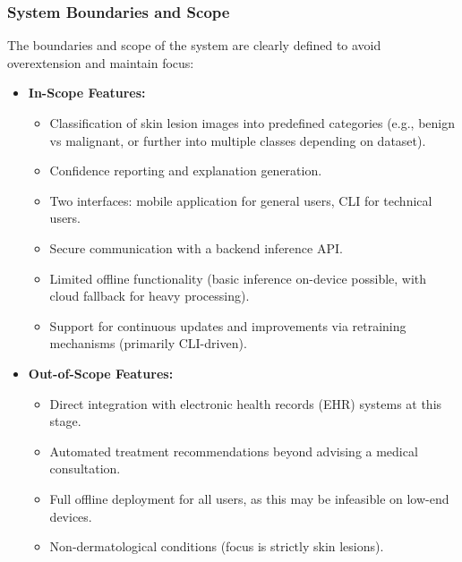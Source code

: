 \documentclass[
  12pt,
  oneside]{article}
\providecommand{\tightlist}{%
  \setlength{\itemsep}{0pt}\setlength{\parskip}{0pt}}
\begin{document}
\subsubsection{System Boundaries and
Scope}\label{system-boundaries-and-scope}

The boundaries and scope of the system are clearly defined to avoid
overextension and maintain focus:

\begin{itemize}
\item
  \textbf{In-Scope Features:}

  \begin{itemize}
  \tightlist
  \item
    Classification of skin lesion images into predefined categories
    (e.g., benign vs malignant, or further into multiple classes
    depending on dataset).\\
  \item
    Confidence reporting and explanation generation.\\
  \item
    Two interfaces: mobile application for general users, CLI for
    technical users.\\
  \item
    Secure communication with a backend inference API.\\
  \item
    Limited offline functionality (basic inference on-device possible,
    with cloud fallback for heavy processing).\\
  \item
    Support for continuous updates and improvements via retraining
    mechanisms (primarily CLI-driven).
  \end{itemize}
\item
  \textbf{Out-of-Scope Features:}

  \begin{itemize}
  \tightlist
  \item
    Direct integration with electronic health records (EHR) systems at
    this stage.\\
  \item
    Automated treatment recommendations beyond advising a medical
    consultation.\\
  \item
    Full offline deployment for all users, as this may be infeasible on
    low-end devices.\\
  \item
    Non-dermatological conditions (focus is strictly skin lesions).
  \end{itemize}
\end{itemize}
\end{document}
